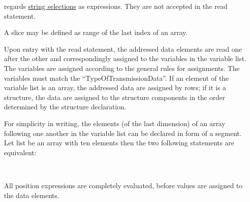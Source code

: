 \begin{grammarframe}


\end{grammarframe}

\OpenPEARL{} regards \hyperlink{StringSelection}{string selections} as
expressions. They are not accepted in the read statement.

A slice may be defined as range of the last index of an array.
\begin{grammarframe}








\end{grammarframe}


Upon entry with the read statement, the addressed data elements are
read one after the other and correspondingly assigned to the variables
in the variable list.
 The variables are assigned according to the
general rules for assignments.
The variables must match the ``TypeOfTransmissionData''.
 If an element of the variable list is an
array, the addressed data are assigned by rows; if it is a structure, the
data are assigned to the structure components in the order determined by
the structure declaration.

For simplicity in writing, the elements (of the last dimension) of an
array following one another in the variable list can be declared in form
of a segment. Let list be an array with ten elements  then the two following statements are equivalent:

\\

All position expressions are completely evaluated, before values are
assigned to the data elements.

